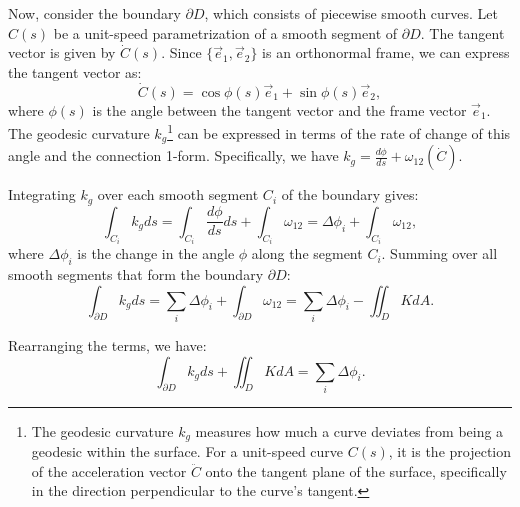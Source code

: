 \begin{solution}
Now, consider the boundary $\partial D$, which consists of piecewise smooth curves. Let $C(s)$ be a unit-speed parametrization of a smooth segment of $\partial D$. The tangent vector is given by $\dot{C}(s)$. Since $\{\vec{e}_1, \vec{e}_2\}$ is an orthonormal frame, we can express the tangent vector as:
\[ \dot{C}(s) = \cos\phi(s) \vec{e}_1 + \sin\phi(s) \vec{e}_2, \]
where $\phi(s)$ is the angle between the tangent vector and the frame vector $\vec{e}_1$. The geodesic curvature $k_g$\footnote{The geodesic curvature $k_g$ measures how much a curve deviates from being a geodesic within the surface. For a unit-speed curve $C(s)$, it is the projection of the acceleration vector $\ddot{C}$ onto the tangent plane of the surface, specifically in the direction perpendicular to the curve's tangent.} can be expressed in terms of the rate of change of this angle and the connection 1-form. Specifically, we have $k_g = \frac{d\phi}{ds} + \omega_{12}(\dot{C})$.

Integrating $k_g$ over each smooth segment $C_i$ of the boundary gives:
\[ \int_{C_i} k_g ds = \int_{C_i} \frac{d\phi}{ds} ds + \int_{C_i} \omega_{12} = \Delta \phi_i + \int_{C_i} \omega_{12}, \]
where $\Delta \phi_i$ is the change in the angle $\phi$ along the segment $C_i$. Summing over all smooth segments that form the boundary $\partial D$:
\[ \int_{\partial D} k_g ds = \sum_i \Delta \phi_i + \int_{\partial D} \omega_{12} = \sum_i \Delta \phi_i - \iint_D K dA. \]

Rearranging the terms, we have:
\[ \int_{\partial D} k_g ds + \iint_D K dA = \sum_i \Delta \phi_i. \]


\end{solution}
